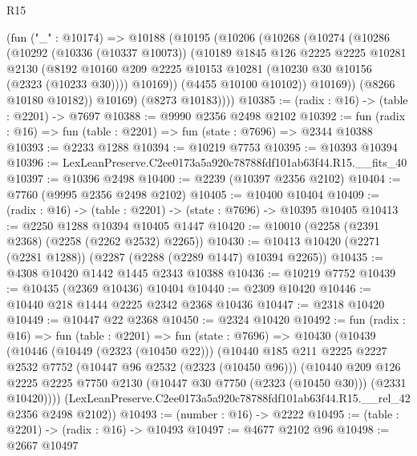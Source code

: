 \begin{lexlean}{R15}
\begin{coremodule}
        (fun ("_" : @10174) =>
        @10188
          (@10195
            (@10206
              (@10268
                (@10274
                  (@10286
                    (@10292
                      (@10336 (@10337 @10073))
                      (@10189
                        @1845
                        @126
                        @2225
                        @2225
                        @10281
                        @2130
                        (@8192
                          @10160
                          @209
                          @2225
                          @10153
                          @10281
                          (@10230 @30 @10156 (@2323 (@10233 @30))))
                        @10169))
                    (@4455 @10100 @10102))
                  @10169))
              (@8266 @10180 @10182))
            @10169)
          (@8273 @10183))))
@10385 := (radix : @16) -> (table : @2201) -> @7697
@10388 := @9990 @2356 @2498 @2102
@10392 := fun (radix : @16) => fun (table : @2201) => fun (state : @7696) => @2344 @10388
@10393 := @2233 @1288
@10394 := @10219 @7753
@10395 := @10393 @10394
@10396 := LexLeanPreserve.C2ee0173a5a920c78788fdf101ab63f44.R15.__fits_40
@10397 := @10396 @2498
@10400 := @2239 (@10397 @2356 @2102)
@10404 := @7760 (@9995 @2356 @2498 @2102)
@10405 := @10400 @10404
@10409 := (radix : @16) -> (table : @2201) -> (state : @7696) -> @10395 @10405
@10413 := @2250 @1288 @10394 @10405 @1447
@10420 := @10010 (@2258 (@2391 @2368) (@2258 (@2262 @2532) @2265))
@10430 := @10413 @10420 (@2271 (@2281 @1288)) (@2287 (@2288 (@2289 @1447) @10394 @2265))
@10435 := @4308 @10420 @1442 @1445 @2343 @10388
@10436 := @10219 @7752
@10439 := @10435 (@2369 @10436) @10404
@10440 := @2309 @10420
@10446 := @10440 @218 @1444 @2225 @2342 @2368 @10436
@10447 := @2318 @10420
@10449 := @10447 @22 @2368
@10450 := @2324 @10420
@10492 := fun (radix : @16) =>
  fun (table : @2201) =>
  fun (state : @7696) =>
  @10430
    (@10439
      (@10446
        (@10449 (@2323 (@10450 @22)))
        (@10440
          @185
          @211
          @2225
          @2227
          @2532
          @7752
          (@10447 @96 @2532 (@2323 (@10450 @96)))
          (@10440
            @209
            @126
            @2225
            @2225
            @7750
            @2130
            (@10447 @30 @7750 (@2323 (@10450 @30)))
            (@2331 @10420))))
      (LexLeanPreserve.C2ee0173a5a920c78788fdf101ab63f44.R15.__rel_42 @2356 @2498 @2102))
@10493 := (number : @16) -> @2222
@10495 := (table : @2201) -> (radix : @16) -> @10493
@10497 := @4677 @2102 @96
@10498 := @2667 @10497

\end{coremodule}
\end{lexlean}
